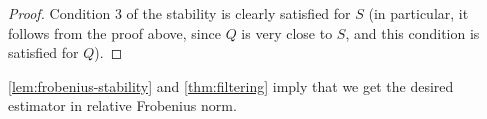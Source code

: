 \begin{proof}
    Condition 3 of the stability is clearly satisfied for $S$ (in particular, it follows from the proof above, since $Q$ is very close to $S$, and this condition is satisfied for $Q$).
\end{proof}

\cref{lem:frobenius-stability} and \cref{thm:filtering} imply that we get the desired estimator in relative Frobenius norm.